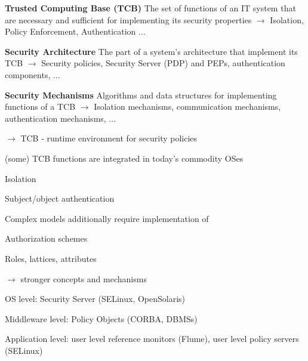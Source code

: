 \documentclass[a4paper]{article}
\renewcommand{\note}[2]{\begin{noteBox} \textbf{#1} #2 \end{noteBox}}
\begin{document}
\begin{multicols}{3}
    \note{Trusted Computing Base (TCB)}{The set of functions of an IT system that are necessary and sufficient for implementing its security properties $\rightarrow$ Isolation, Policy Enforcement, Authentication ...}

    \note{Security Architecture}{The part of a system’s architecture that implement its TCB $\rightarrow$ Security policies, Security Server (PDP) and PEPs, authentication components, ...}

    \note{Security Mechanisms}{Algorithms and data structures for implementing functions of a TCB $\rightarrow$ Isolation mechanisms, communication mechanisms, authentication mechanisms, ...}

    $\rightarrow$ TCB - runtime environment for security policies

    \begin{itemize*}
        \item (some) TCB functions are integrated in today's commodity OSes
        \begin{itemize*}
            \item Isolation
            \item Subject/object authentication
        \end{itemize*}
        \item Complex models additionally require implementation of
        \begin{itemize*}
            \item Authorization schemes
            \item Roles, lattices, attributes
            \item[$\rightarrow$] stronger concepts and mechanisms
            \item OS level: Security Server (SELinux, OpenSolaris)
            \item Middleware level: Policy Objects (CORBA, DBMSs)
            \item Application level: user level reference monitors (Flume), user level policy servers (SELinux)
        \end{itemize*}
    \end{itemize*}


\end{multicols}
\end{document}
